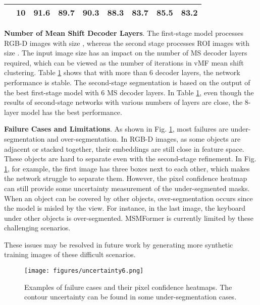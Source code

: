 \documentclass[letterpaper, 10 pt, conference]{ieeeconf}
\begin{document}
\begin{table}
{\begin{tabular}{|c|c|ccccccc|}
                              & 10                                                                                 & 91.6          & 89.7          & \multicolumn{1}{c|}{90.3}          & 88.3          & 83.7          & \multicolumn{1}{c|}{85.5}          & 83.2          \\ \hline
\end{tabular}
  }
  \label{2dec}
\vspace{-4mm}
\end{table}

\textbf{Number of Mean Shift Decoder Layers}. The first-stage model processes RGB-D images with size , whereas the second stage processes ROI images with size . The input image size has an impact on the number of MS decoder layers required, which can be viewed as the number of iterations in vMF mean shift clustering. Table \ref{2dec} shows that with more than 6 decoder layers, the network performance is stable. The second-stage segmentation is based on the output of the best first-stage model with 6 MS decoder layers. In Table \ref{2dec}, even though the results of second-stage networks with various numbers of layers are close, the 8-layer model has the best performance.

\textbf{Failure Cases and Limitations}. As shown in Fig. \ref{fig:failure}, most failures are under-segmentation and over-segmentation. In RGB-D images, as some objects are adjacent or stacked together, their embeddings are still close in feature space. These objects are hard to separate even with the second-stage refinement. In Fig. \ref{fig:failure}, for example, the first image has three boxes next to each other, which makes the network struggle to separate them. However, the pixel confidence heatmap can still provide some uncertainty measurement of the under-segmented masks. When an object can be covered by other objects, over-segmentation occurs since the model is misled by the view. For instance, in the last image, the keyboard under other objects is over-segmented. MSMFormer is currently limited by these challenging scenarios.


These issues may be resolved in future work by generating more synthetic training images of these difficult scenarios.

\begin{figure}
    \centering
\texttt{[image: figures/uncertainty6.png]}
    \vspace{-4mm}
    \caption{Examples of failure cases and their pixel confidence heatmaps. The contour uncertainty can be found in some under-segmentation cases.}
    \label{fig:failure}
    \vspace{-4mm}
\end{figure}
\end{document}

